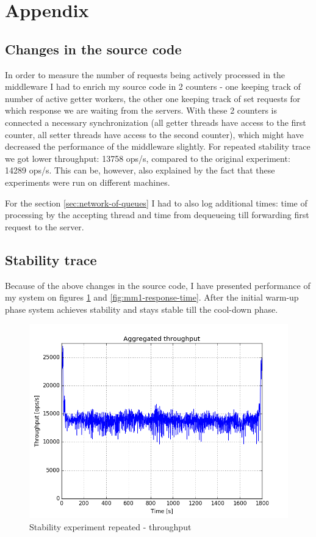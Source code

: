 \documentclass[11pt]{article}
\begin{document}
\pagebreak

\section*{Appendix}

\subsection{Changes in the source code}
In order to measure the number of requests being actively processed in the middleware I had to enrich my source code in 2 counters - one keeping track of number of active getter workers, the other one keeping track of set requests for which response we are waiting from the servers. With these 2 counters is connected a necessary synchronization (all getter threads have access to the first counter, all setter threads have access to the second counter), which might have decreased the performance of the middleware slightly. For repeated stability trace we got lower throughput: 13758 ops/s, compared to the original experiment: 14289 ops/s. This can be, however, also explained by the fact that these experiments were run on different machines.

For the section \ref{sec:network-of-queues} I had to also log additional times: time of processing by the accepting thread and time from dequeueing till forwarding first request to the server. 

\subsection{Stability trace}

Because of the above changes in the source code, I have presented performance of my system on figures \ref{fig:mm1-throughput} and \ref{fig:mm1-response-time}. After the initial warm-up phase system achieves stability and stays stable till the cool-down phase.

\begin{figure}
\centering
\includegraphics[width=0.95\linewidth]{plots/mm1_throughput}
\caption{Stability experiment repeated - throughput}
\label{fig:mm1-throughput}
\end{figure}
\end{document}
